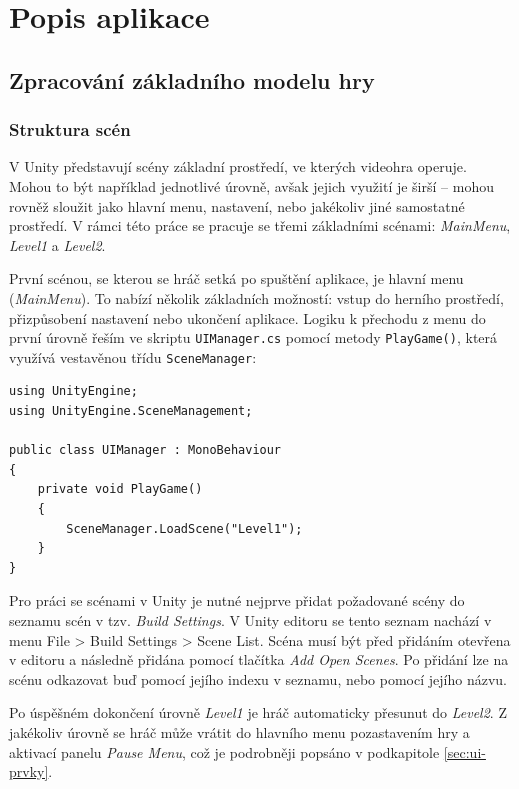 \chapter{Popis aplikace}
\label{sec:popis-aplikace}

\section{Zpracování základního modelu hry}
\label{sec:zpracovani-zakladniho-modelu-hry}

\subsection{Struktura scén}
\label{sec:struktura-scen}

V Unity představují scény základní prostředí, ve kterých videohra operuje. Mohou to být například jednotlivé úrovně, avšak jejich využití je širší – mohou rovněž sloužit jako hlavní menu, nastavení, nebo jakékoliv jiné samostatné prostředí. V rámci této práce se pracuje se třemi základními scénami: \emph{MainMenu}, \emph{Level1} a \emph{Level2}.

První scénou, se kterou se hráč setká po spuštění aplikace, je hlavní menu (\emph{MainMenu}). To nabízí několik základních možností: vstup do herního prostředí, přizpůsobení nastavení nebo ukončení aplikace. Logiku k přechodu z menu do první úrovně řeším ve skriptu \texttt{UIManager.cs} pomocí metody \texttt{PlayGame()}, která využívá vestavěnou třídu \texttt{SceneManager}:

\begin{lstlisting}[caption={UIManager.PlayGame()}, label={lst:uimanager-playgame}]
using UnityEngine;
using UnityEngine.SceneManagement;

public class UIManager : MonoBehaviour
{
    private void PlayGame()
    {
        SceneManager.LoadScene("Level1");
    }
}
\end{lstlisting}

Pro práci se scénami v Unity je nutné nejprve přidat požadované scény do seznamu scén v tzv. \emph{Build Settings}. V Unity editoru se tento seznam nachází v menu File > Build Settings > Scene List. Scéna musí být před přidáním otevřena v editoru a následně přidána pomocí tlačítka \emph{Add Open Scenes}. Po přidání lze na scénu odkazovat buď pomocí jejího indexu v seznamu, nebo pomocí jejího názvu.

Po úspěšném dokončení úrovně \emph{Level1} je hráč automaticky přesunut do \emph{Level2}. Z jakékoliv úrovně se hráč může vrátit do hlavního menu pozastavením hry a aktivací panelu \emph{Pause Menu}, což je podrobněji popsáno v podkapitole \ref{sec:ui-prvky}.

